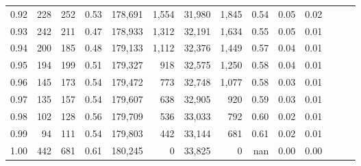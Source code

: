 \begin{tabular}{rrrrrrrrrrrrrr}
0.92 &    228 &  252 &  0.53 &  178,691 &    1,554 &  31,980 &   1,845 &  0.54 &  0.05 &      0.02 \\
0.93 &    242 &  211 &  0.47 &  178,933 &    1,312 &  32,191 &   1,634 &  0.55 &  0.05 &      0.01 \\
0.94 &    200 &  185 &  0.48 &  179,133 &    1,112 &  32,376 &   1,449 &  0.57 &  0.04 &      0.01 \\
0.95 &    194 &  199 &  0.51 &  179,327 &      918 &  32,575 &   1,250 &  0.58 &  0.04 &      0.01 \\
0.96 &    145 &  173 &  0.54 &  179,472 &      773 &  32,748 &   1,077 &  0.58 &  0.03 &      0.01 \\
0.97 &    135 &  157 &  0.54 &  179,607 &      638 &  32,905 &     920 &  0.59 &  0.03 &      0.01 \\
0.98 &    102 &  128 &  0.56 &  179,709 &      536 &  33,033 &     792 &  0.60 &  0.02 &      0.01 \\
0.99 &     94 &  111 &  0.54 &  179,803 &      442 &  33,144 &     681 &  0.61 &  0.02 &      0.01 \\
1.00 &    442 &  681 &  0.61 &  180,245 &        0 &  33,825 &       0 &   nan &  0.00 &      0.00 \\
\bottomrule
\end{tabular}
